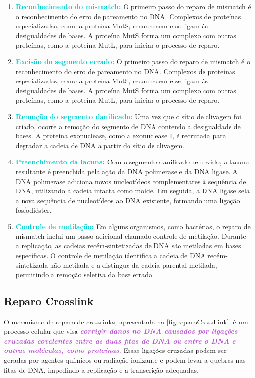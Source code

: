 \documentclass[11pt,a4paper]{article}
\begin{document}
	\begin{enumerate}[label=\textcolor{CarnationPink}{\arabic*${}^\circ $}]
		\item \textcolor{DarkTurquoise}{\textbf{Reconhecimento do mismatch:}} O primeiro passo do reparo de mismatch é o reconhecimento do erro de pareamento no DNA. Complexos de proteínas especializadas, como a proteína MutS, reconhecem e se ligam às desigualdades de bases. A proteína MutS forma um complexo com outras proteínas, como a proteína MutL, para iniciar o processo de reparo.
		\item \textcolor{DarkTurquoise}{\textbf{Excisão do segmento errado:}} O primeiro passo do reparo de mismatch é o reconhecimento do erro de pareamento no DNA. Complexos de proteínas especializadas, como a proteína MutS, reconhecem e se ligam às desigualdades de bases. A proteína MutS forma um complexo com outras proteínas, como a proteína MutL, para iniciar o processo de reparo.
		\item \textcolor{DarkTurquoise}{\textbf{Remoção do segmento danificado:}} Uma vez que o sítio de clivagem foi criado, ocorre a remoção do segmento de DNA contendo a desigualdade de bases. A proteína exonuclease, como a exonuclease I, é recrutada para degradar a cadeia de DNA a partir do sítio de clivagem.
		\item \textcolor{DarkTurquoise}{\textbf{Preenchimento da lacuna:}} Com o segmento danificado removido, a lacuna resultante é preenchida pela ação da DNA polimerase e da DNA ligase. A DNA polimerase adiciona novos nucleotídeos complementares à sequência de DNA, utilizando a cadeia intacta como molde. Em seguida, a DNA ligase sela a nova sequência de nucleotídeos ao DNA existente, formando uma ligação fosfodiéster.
		\item \textcolor{DarkTurquoise}{\textbf{Controle de metilação:}} Em alguns organismos, como bactérias, o reparo de mismatch inclui um passo adicional chamado controle de metilação. Durante a replicação, as cadeias recém-sintetizadas de DNA são metiladas em bases específicas. O controle de metilação identifica a cadeia de DNA recém-sintetizada não metilada e a distingue da cadeia parental metilada, permitindo a remoção seletiva da base errada.
	\end{enumerate}

\subsection*{Reparo Crosslink}
	
	O mecanismo de reparo de crosslinks, apresentado na \ref{fig:reparoCrossLink}, é um processo celular que visa \textcolor{MediumOrchid}{\textbf{\textit{corrigir danos no DNA causados por ligações cruzadas covalentes entre as duas fitas de DNA ou entre o DNA e outras moléculas, como proteínas}}}. Essas ligações cruzadas podem ser geradas por agentes químicos ou radiação ionizante e podem levar a quebras nas fitas de DNA, impedindo a replicação e a transcrição adequadas.
\end{document}
